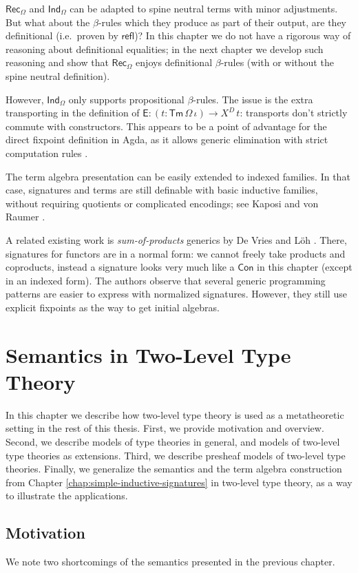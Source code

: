 \documentclass[12pt,a4paper,twoside,openany]{book}
\theoremstyle{remark}
\theoremstyle{definition}
\theoremstyle{theorem}
\newcommand{\ms}[1]{\mathsf{#1}}
\newcommand{\refl}{\mathsf{refl}}
\newcommand{\Con}{\mathsf{Con}}
\newcommand{\Tm}{\mathsf{Tm}}
\newcommand{\Rec}{\ms{Rec}}
\newcommand{\Ind}{\ms{Ind}}
\begin{document}
$\Rec_\Omega$ and $\Ind_\Omega$ can be adapted to spine neutral terms with minor
adjustments. But what about the $\beta$-rules which they produce as part of
their output, are they definitional (i.e.\ proven by $\refl$)? In this chapter
we do not have a rigorous way of reasoning about definitional equalities; in the
next chapter we develop such reasoning and show that $\Rec_\Omega$ enjoys
definitional $\beta$-rules (with or without the spine neutral
definition).

However, $\Ind_\Omega$ only supports propositional $\beta$-rules. The issue is
the extra transporting in the definition of $\ms{E} : (t : \Tm\,\Omega\,\iota)
\to X^D\,t$: transports don't strictly commute with constructors. This appears
to be a point of advantage for the direct fixpoint definition in Agda, as it
allows generic elimination with strict computation rules \cite{TODO}.

The term algebra presentation can be easily extended to indexed families. In
that case, signatures and terms are still definable with basic inductive
families, without requiring quotients or complicated encodings; see Kaposi and
von Raumer \cite{mutualinductive}.

A related existing work is \emph{sum-of-products} generics by De Vries and Löh
\cite{sop}. There, signatures for functors are in a normal form: we cannot
freely take products and coproducts, instead a signature looks very much like a
$\Con$ in this chapter (except in an indexed form). The authors observe that
several generic programming patterns are easier to express with normalized
signatures. However, they still use explicit fixpoints as the way to get initial
algebras.

\chapter{Semantics in Two-Level Type Theory}
\label{chap:2ltt}

In this chapter we describe how two-level type theory is used as a metatheoretic
setting in the rest of this thesis. First, we provide motivation and
overview. Second, we describe models of type theories in general, and models of
two-level type theories as extensions. Third, we describe presheaf models of
two-level type theories. Finally, we generalize the semantics and the term
algebra construction from Chapter \ref{chap:simple-inductive-signatures} in
two-level type theory, as a way to illustrate the applications.

\section{Motivation}
\label{sec:2ltt-motivation}
We note two shortcomings of the semantics presented in the
previous chapter.
\end{document}
